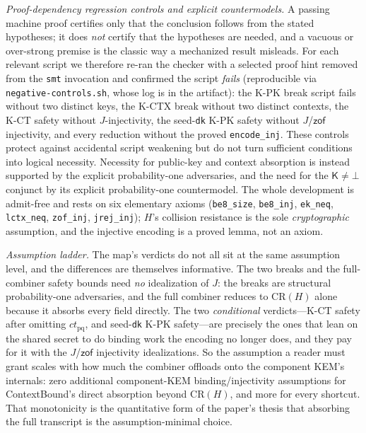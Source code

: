 \documentclass[journal]{IEEEtran}
\newcommand{\code}[1]{\texttt{\small #1}}
\begin{document}
\emph{Proof-dependency regression controls and explicit countermodels.} A passing machine proof certifies only
that the conclusion follows from the stated hypotheses; it does \emph{not} certify that the
hypotheses are needed, and a vacuous or over-strong premise is the classic way a mechanized result
misleads. For each relevant script we therefore re-ran the checker with a selected proof hint
removed from the \code{smt} invocation and confirmed the script \emph{fails} (reproducible via
\code{negative-controls.sh}, whose log is in the artifact): the K-PK break script fails
without two distinct keys, the K-CTX break without two distinct contexts, the K-CT safety without
$J$-injectivity, the seed-\code{dk} K-PK safety without $J$/$\mathsf{zof}$ injectivity, and every
reduction without the proved \code{encode\_inj}. These controls protect against accidental script
weakening but do not turn sufficient conditions into logical necessity. Necessity for public-key and
context absorption is instead supported by the explicit probability-one adversaries, and the need
for the $\mathsf{K}\neq\bot$ conjunct by its explicit probability-one countermodel. The whole development is
admit-free and rests on six elementary axioms (\code{be8\_size}, \code{be8\_inj}, \code{ek\_neq},
\code{lctx\_neq}, \code{zof\_inj}, \code{jrej\_inj}); $H$'s collision resistance is the sole
\emph{cryptographic} assumption, and the injective encoding is a proved lemma, not an axiom.

\emph{Assumption ladder.} The map's verdicts do not all sit at the same assumption level, and
the differences are themselves informative. The two breaks and the full-combiner safety bounds need
\emph{no} idealization of $J$: the breaks are structural probability-one adversaries, and the full
combiner reduces to $\mathrm{CR}(H)$ alone because it absorbs every field directly. The two
\emph{conditional} verdicts---K-CT safety after omitting $ct_{\mathrm{pq}}$, and seed-\code{dk} K-PK
safety---are precisely the ones that lean on the shared secret to do binding work the encoding no
longer does, and they pay for it with the $J$/$\mathsf{zof}$ injectivity idealizations. So the
assumption a reader must grant scales with how much the combiner offloads onto the component KEM's
internals: zero additional component-KEM binding/injectivity assumptions for ContextBound's direct
absorption beyond $\mathrm{CR}(H)$, and more for every shortcut. That monotonicity is
the quantitative form of the paper's thesis that absorbing the full transcript is the
assumption-minimal choice.
\end{document}
